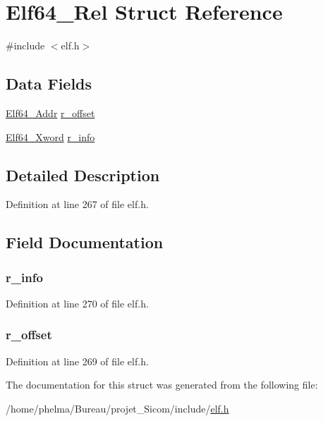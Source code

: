 \hypertarget{struct_elf64___rel}{\section{Elf64\-\_\-\-Rel Struct Reference}
\label{struct_elf64___rel}
}


{\ttfamily \#include $<$elf.\-h$>$}

\subsection*{Data Fields}
\begin{DoxyCompactItemize}
\item 
\hyperlink{elf_8h_aeed51d08e3a950d637f8ec1f0cd4ef65}{Elf64\-\_\-\-Addr} \hyperlink{struct_elf64___rel_a21afad4c85269dd5b12d5c836508cc36}{r\-\_\-offset}
\item 
\hyperlink{elf_8h_a5447a48a3dae0bd24f606415268c6fe4}{Elf64\-\_\-\-Xword} \hyperlink{struct_elf64___rel_a3876714743e1e751d96819f888a09158}{r\-\_\-info}
\end{DoxyCompactItemize}


\subsection{Detailed Description}


Definition at line 267 of file elf.\-h.



\subsection{Field Documentation}
\hypertarget{struct_elf64___rel_a3876714743e1e751d96819f888a09158}{
\subsubsection[{r\-\_\-info}]{ r\-\_\-info}}\label{struct_elf64___rel_a3876714743e1e751d96819f888a09158}


Definition at line 270 of file elf.\-h.

\hypertarget{struct_elf64___rel_a21afad4c85269dd5b12d5c836508cc36}{
\subsubsection[{r\-\_\-offset}]{ r\-\_\-offset}}\label{struct_elf64___rel_a21afad4c85269dd5b12d5c836508cc36}


Definition at line 269 of file elf.\-h.



The documentation for this struct was generated from the following file\-:\begin{DoxyCompactItemize}
\item 
/home/phelma/\-Bureau/projet\-\_\-\-Sicom/include/\hyperlink{elf_8h}{elf.\-h}\end{DoxyCompactItemize}
